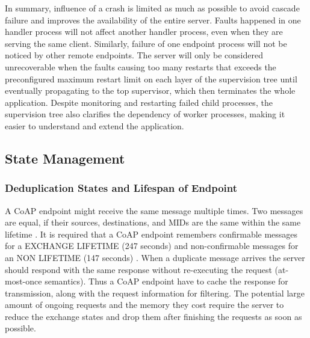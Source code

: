 In summary, influence of a crash is limited as much as possible to avoid cascade failure and improves the availability of the entire server. Faults happened in one handler process will not affect another handler process, even when they are serving the same client. Similarly, failure of one endpoint process will not be noticed by other remote endpoints. The server will only be considered unrecoverable when the faults causing too many restarts that exceeds the preconfigured maximum restart limit on each layer of the supervision tree until eventually propagating to the top supervisor, which then terminates the whole application. Despite monitoring and restarting failed child processes, the supervision tree also clarifies the dependency of worker processes, making it easier to understand and extend the application.

\subsection{State Management}\label{state_management}

\subsubsection{Deduplication States and Lifespan of Endpoint}

A CoAP endpoint might receive the same message multiple times. Two messages are equal, if their sources, destinations, and MIDs are the same within the same lifetime \autocite{lanter2013scalability}. It is required that a CoAP endpoint remembers confirmable messages for a EXCHANGE LIFETIME (247 seconds) and non-confirmable messages for an NON LIFETIME (147 seconds) \autocite{coap_protocol}. When a duplicate message arrives the server should respond with the same response without re-executing the request (at-most-once semantics). Thus a CoAP endpoint have to cache the response for transmission, along with the request information for filtering. The potential large amount of ongoing requests and the memory they cost require the server to reduce the exchange states and drop them after finishing the requests as soon as possible. 

